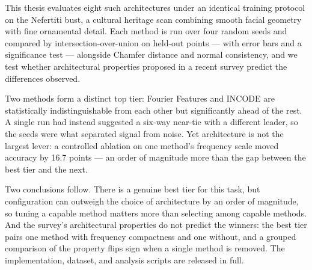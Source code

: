 This thesis evaluates eight such architectures under an identical training protocol on the Nefertiti bust, a cultural heritage scan combining smooth facial geometry with fine ornamental detail. Each method is run over four random seeds and compared by intersection-over-union on held-out points --- with error bars and a significance test --- alongside Chamfer distance and normal consistency, and we test whether architectural properties proposed in a recent survey predict the differences observed.

Two methods form a distinct top tier: Fourier Features and INCODE are statistically indistinguishable from each other but significantly ahead of the rest. A single run had instead suggested a six-way near-tie with a different leader, so the seeds were what separated signal from noise. Yet architecture is not the largest lever: a controlled ablation on one method's frequency scale moved accuracy by 16.7 points --- an order of magnitude more than the gap between the best tier and the next.

Two conclusions follow. There is a genuine best tier for this task, but configuration can outweigh the choice of architecture by an order of magnitude, so tuning a capable method matters more than selecting among capable methods. And the survey's architectural properties do not predict the winners: the best tier pairs one method with frequency compactness and one without, and a grouped comparison of the property flips sign when a single method is removed. The implementation, dataset, and analysis scripts are released in full.
